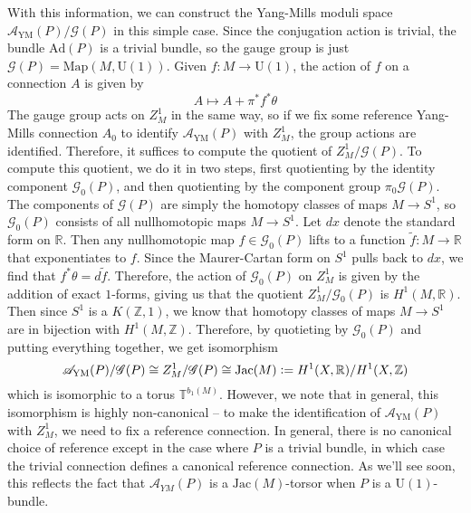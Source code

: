 \documentclass[psamsfonts, 12pt]{amsart}
\theoremstyle{definition}
\theoremstyle{remark}
\newcommand{\R}{\mathbb{R}}
\newcommand{\Z}{\mathbb{Z}}
\newcommand{\defeq}{\vcentcolon=}
\begin{document}
With this information, we can construct the Yang-Mills moduli space
$\mathscr{A}_{\text{YM}}(P) / \mathscr{G}(P)$ in this simple case. Since the
conjugation action is trivial, the bundle $\mathrm{Ad}(P)$ is a trivial bundle,
so the gauge group is just $\mathscr{G}(P) = \mathrm{Map}(M,\mathrm{U}(1))$. Given
$f : M \to \mathrm{U}(1)$, the action of $f$ on a connection $A$ is given by
\[
A \mapsto A + \pi^*f^*\theta
\]
The gauge group acts on $Z^1_M$ in the same way, so if we fix some reference Yang-Mills
connection $A_0$ to identify $\mathscr{A}_{\text{YM}}(P)$ with $Z^1_M$, the
group actions are identified. Therefore, it suffices to compute the quotient
of $Z^1_M/\mathscr{G}(P)$. To compute this quotient, we do it in two steps,
first quotienting by the identity component $\mathscr{G}_0(P)$, and then quotienting
by the component group $\pi_0\mathscr{G}(P)$. The components of $\mathscr{G}(P)$
are simply the homotopy classes of maps $M \to S^1$, so $\mathscr{G}_0(P)$ consists
of all nullhomotopic maps $M \to S^1$. Let $dx$ denote the standard form
on $\R$. Then any nullhomotopic map $f \in \mathscr{G}_0(P)$ lifts to a function
$\tilde{f} : M \to \R$ that exponentiates to $f$. Since the Maurer-Cartan form
on $S^1$ pulls back to $dx$, we find that $f^*\theta = d\tilde{f}$. Therefore,
the action of $\mathscr{G}_0(P)$ on $Z^1_M$ is given by the addition of exact
$1$-forms, giving us that the quotient $Z^1_M / \mathscr{G}_0(P)$ is
$H^1(M,\R)$. Then since $S^1$ is a $K(\Z,1)$, we know that homotopy classes
of maps $M \to S^1$ are in bijection with $H^1(M,\Z)$. Therefore, by quotieting
by $\mathscr{G}_0(P)$ and putting everything together, we get isomorphism
\[
\mathscr{A}_{\text{YM}}(P) /\mathscr{G}(P) \cong Z^1_M/\mathscr{G}(P)
\cong \mathrm{Jac}(M) \defeq H^1(X,\R)/H^1(X,\Z)
\]
which is isomorphic to a torus $\mathbb{T}^{b_1(M)}$. However, we note that in general,
this isomorphism is highly non-canonical -- to make the identification of
$\mathscr{A}_{\text{YM}}(P)$ with $Z^1_M$, we need to fix a reference connection. In
general, there is no canonical choice of reference except in the case where $P$ is a
trivial bundle, in which case the trivial connection defines a canonical reference
connection. As we'll see soon, this reflects the fact that $\mathscr{A}_{YM}(P)$
is a $\mathrm{Jac}(M)$-torsor when $P$ is a $\mathrm{U}(1)$-bundle.
%
%
\end{document}

